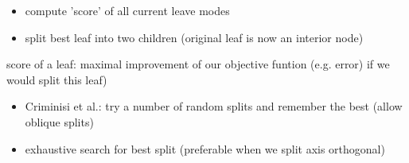 \documentclass[11pt]{article}
\begin{document}
\begin{itemize}
\begin{itemize}
              \begin{itemize}
                \item compute 'score' of all current leave modes
                \item split best leaf into two children (original leaf is now an interior node)
              \end{itemize}
            \end{itemize}
            score of a leaf: maximal improvement of our objective funtion (e.g. error) if we would split this leaf)
            \begin{itemize}
              \item Criminisi et al.: try a number of random splits and remember the best (allow oblique splits)
              \item exhaustive search for best split (preferable when we split axis orthogonal)
            \end{itemize}

\end{itemize}
\end{document}
